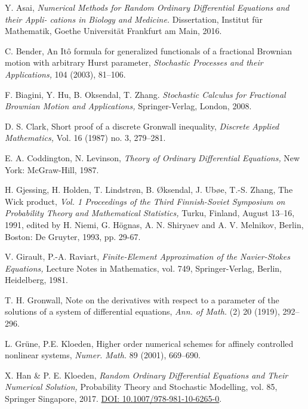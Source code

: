 \documentclass[reqno,12pt]{amsart}
\theoremstyle{plain}%
\theoremstyle{definition}
\begin{document}
\begin{thebibliography}{25}
     Y. Asai, \emph{Numerical Methods for Random Ordinary Differential Equations and their Appli-
    cations in Biology and Medicine.} Dissertation, Institut für Mathematik, Goethe Universität Frankfurt am Main, 2016.

     C. Bender, An It\^o formula for generalized functionals of a fractional Brownian motion with arbitrary Hurst parameter, \emph{Stochastic Processes and their Applications,} 104 (2003), 81--106.

     F. Biagini, Y. Hu, B. Oksendal, T. Zhang. \emph{Stochastic Calculus for Fractional Brownian Motion and Applications,} Springer-Verlag, London, 2008.

     D. S. Clark, Short proof of a discrete Gronwall inequality, \emph{Discrete Applied Mathematics,} Vol. 16 (1987) no. 3, 279--281.

     E. A. Coddington, N. Levinson, \emph{Theory of Ordinary Differential Equations,} New York: McGraw-Hill, 1987.

     H. Gjessing, H. Holden, T. Lindstr\o n, B. \O ksendal, J. Ub\o e, T.-S. Zhang, The Wick product, \emph{Vol. 1 Proceedings of the Third Finnish-Soviet Symposium on Probability Theory and Mathematical Statistics,} Turku, Finland, August 13--16, 1991, edited by H. Niemi, G. Högnas, A. N. Shiryaev and A. V. Melnikov, Berlin, Boston: De Gruyter, 1993, pp. 29-67.

     V. Girault, P.-A. Raviart, \emph{Finite-Element Approximation of the Navier-Stokes Equations,} Lecture Notes in Mathematics, vol. 749, Springer-Verlag, Berlin, Heidelberg, 1981.

     T. H. Gronwall, Note on the derivatives with respect to a parameter of the solutions of a system of differential equations, \emph{Ann. of Math.} (2) 20 (1919), 292--296.

     L. Gr\"une, P.E. Kloeden, Higher order numerical schemes for affinely controlled nonlinear systems, \emph{Numer. Math.} 89 (2001), 669--690.

     X. Han \& P. E. Kloeden, \emph{Random Ordinary Differential Equations and Their Numerical Solution,} Probability Theory and Stochastic Modelling, vol. 85, Springer Singapore, 2017. \href{https://link.springer.com/book/10.1007/978-981-10-6265-0}{DOI: 10.1007/978-981-10-6265-0}.


\end{thebibliography}
\end{document}
